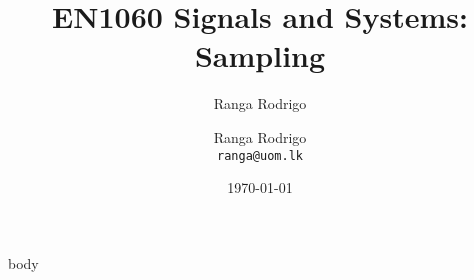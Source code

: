 \documentclass[t, aspectratio=169,xcolor={svgnames}, 10pt]{beamer}
\title{EN1060 Signals and Systems: Sampling}
\author{Ranga Rodrigo}
\author[]{Ranga Rodrigo\\\texttt{ranga@uom.lk}}
\institute[]{The University of Moratuwa, Sri Lanka}
\date{\today}
\begin{document}
    \begin{frame}
        \titlepage
    \end{frame}

















    {body}

\end{document}
